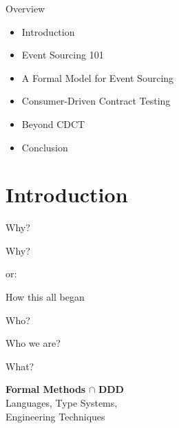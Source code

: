\begin{frame}[fragile]{Overview}

\begin{itemize}
\item Introduction
\item Event Sourcing 101
\item A Formal Model for Event Sourcing
\item Consumer-Driven Contract Testing
\item Beyond CDCT
\item Conclusion
\end{itemize}

\end{frame}

\part{Introduction}

\begin{frame}[fragile]{Why?}

\begin{center}
{
\LARGE
Why?
}

\vspace{2em}

or:

\vspace{2em}

{
\Large
How this all began
}
\end{center}
\end{frame}


\begin{frame}[fragile]{Who?}

\begin{center}
{
\LARGE
Who we are?
}

\vspace{2em}
\end{center}
\end{frame}


\begin{frame}[fragile]{What?}

\begin{center}
{
\LARGE
\textbf{Formal Methods} $\cap$ \textbf{DDD}
\\[2em]
Languages, Type Systems, \\[.2em] Engineering Techniques
}

\vspace{2em}
\end{center}
\end{frame}

